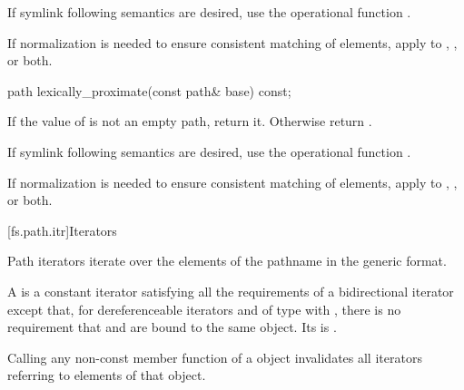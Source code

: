 \begin{itemdescr}
\pnum
\begin{note} If symlink following semantics are desired,
  use the operational function . \end{note}

\pnum
\begin{note} If normalization is needed
  to ensure consistent matching of elements,
  apply  to
  , , or both. \end{note}
\end{itemdescr}

%
\begin{itemdecl}
path lexically_proximate(const path& base) const;
\end{itemdecl}

\begin{itemdescr}
\pnum
\returns If the value of  is not an empty path,
  return it. Otherwise return .

\pnum
\begin{note} If symlink following semantics are desired,
  use the operational function . \end{note}

\pnum
\begin{note} If normalization is needed
  to ensure consistent matching of elements,
  apply  to
  , , or both. \end{note}
\end{itemdescr}

[fs.path.itr]{Iterators}

%
\pnum
Path iterators iterate over the elements of the pathname
in the generic format.

\pnum
A  is a constant iterator satisfying all the
requirements of a bidirectional iterator
except that,
for dereferenceable iterators  and 
of type 
with ,
there is no requirement that  and 
are bound to the same object.
Its  is .

\pnum
Calling any non-const member function of a  object
invalidates all iterators referring to elements of that object.

